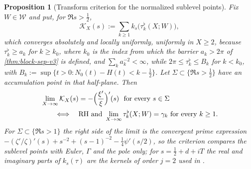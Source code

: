 \documentclass[11pt,a4paper]{article}
\numberwithin{equation}{section}
\newtheorem{proposition}[theorem]{Proposition}
\theoremstyle{definition}
\theoremstyle{remark}
\begin{document}
\begin{proposition}[Transform criterion for the normalized sublevel points]
\label{prop:v8-criterion}
Fix $W\in\mathcal W$ and put, for $\Re s>\frac12$,
\begin{equation}\label{eq:v8-KX}
 \mathcal K_X(s):=\sum_{k\ge1}k_s\bigl(\tau_k^\flat(X;W)\bigr),
\end{equation}
which converges absolutely and locally uniformly, uniformly in $X\ge2$,
because $\tau_k^\flat\ge a_k$ for $k\ge k_0$, where $k_0$ is the index from which the barrier $a_k>2\pi$ of \cref{thm:block-sep-v3} is defined,
and $\sum_ka_k^{-2}<\infty$, while $2\pi\le\tau_k^\flat\le B_k$ for
$k<k_0$, with $B_k:=\sup\{t>0:N_0(t)-H(t)<k-\tfrac12\}$. Let $\Sigma\subset\{\Re s>\frac12\}$ have an accumulation point
in that half-plane. Then
\begin{equation}\label{eq:v8-criterion}
 \begin{aligned}
 &\lim_{X\to\infty}\mathcal K_X(s)=-\Bigl(\frac{\xi'}{\xi}\Bigr)'(s)
 \ \ \text{for every }s\in\Sigma\\
 &\qquad\Longleftrightarrow\quad
 \mathrm{RH}\ \text{and}\ \lim_{X\to\infty}\tau_k^\flat(X;W)=\gamma_k
 \ \text{for every }k\ge1 .
 \end{aligned}
\end{equation}
For $\Sigma\subset\{\Re s>1\}$ the right side of the limit is the
convergent prime expression
$-(\zeta'/\zeta)'(s)+s^{-2}+(s-1)^{-2}-\frac14\psi'(s/2)$, so the
criterion compares the sublevel points with Euler, $\Gamma$ and the
pole only; for $s=\frac12+d+iT$ the real and imaginary parts of
$k_s(\tau)$ are the kernels of order $j=2$ used in \cite{CasanaMCOM}.
\end{proposition}
\end{document}

